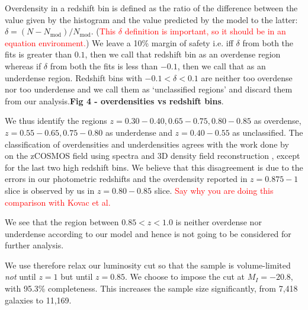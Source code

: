\documentclass[twocolumn,useAMS,usenatbib]{mn2e}
\newcommand{\rachel}[1]{{\textcolor{red}{#1}}}
\begin{document}
Overdensity in a redshift bin is defined as the ratio of the
difference between the value given by the histogram and the value
predicted by the model to the latter:
$\delta=(N-N_{\text{mod}})/N_{\text{mod}}$.  (\rachel{This $\delta$
  definition is important, so it should be in an equation environment.})
We leave a 10\% margin of safety i.e. iff $\delta$ from both the fits is greater than $0.1$, then we call that redshift bin as an
overdense region whereas if $\delta$ from both the fits is less than $-0.1$, then we call that as an underdense region. Redshift bins with $-0.1 < \delta < 0.1$ are neither too overdense
nor too underdense and we call them as `unclassified regions'  and discard them from our analysis.{\bf Fig 4 - overdensities vs redshift bins}.


We thus identify the regions $z=0.30-0.40, 0.65-0.75, 0.80-0.85$ as overdense, $z=0.55-0.65, 0.75-0.80$ as underdense and $z=0.40-0.55$ as unclassified.
The classification of overdensities and underdensities agrees with the work done by~\cite{Kovac_Density10k} on the zCOSMOS field using spectra and 3D density field reconstruction , except for the last two high redshift bins.
We believe that this disagreement is due to the errors in our photometric redshifts and the overdensity reported in $z=0.875-1$ slice
is observed by us in $z=0.80-0.85$ slice.
\rachel{Say why you are doing this comparison with Kovac et al.}

We see that the region between $0.85<z<1.0$ is neither overdense nor underdense according to our model and hence is not going to be considered for further analysis.

We use therefore relax our luminosity cut %
so that the sample is volume-limited \emph{not} until $z=1$ but until $z=0.85$. 
We choose to impose the cut at $M_I=-20.8$, with 95.3\% completeness. This increases the sample size significantly, from 7,418 galaxies to 11,169.
\end{document}
